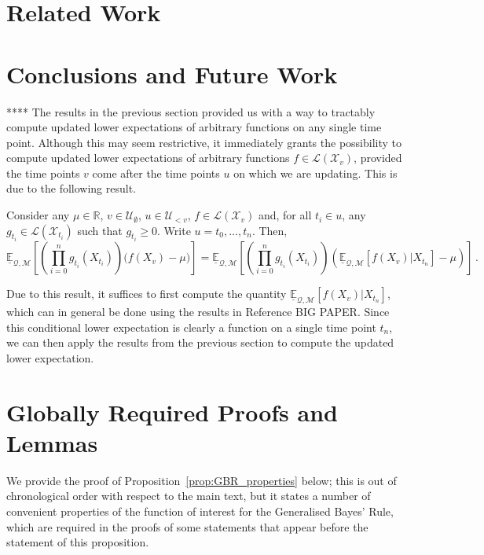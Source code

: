 \documentclass[twoside,11pt]{article}
\newcommand{\reals}{\mathbb{R}}
\newcommand{\states}{\mathcal{X}}
\newcommand{\lexp}{\underline{\mathbb{E}}_{\rateset,\mathcal{M}}}
\newcommand{\gambles}{\mathcal{L}}
\newcommand{\rateset}{\mathcal{Q}}
\begin{document}
\section{Related Work}\label{sec:related}

\section{Conclusions and Future Work}\label{sec:conclusions}

**** The results in the previous section provided us with a way to tractably compute updated lower expectations of arbitrary functions on any single time point. Although this may seem restrictive, it immediately grants the possibility to compute updated lower expectations of arbitrary functions $f\in\gambles(\states_v)$, provided the time points $v$ come after the time points $u$ on which we are updating. This is due to the following result.

\begin{proposition}\label{prop:arbitrary_future_functions}
Consider any $\mu\in\reals$, $v\in\mathcal{U}_\emptyset$, $u\in\mathcal{U}_{<v}$, $f\in\gambles(\states_v)$ and, for all $t_i\in u$, any $g_{t_i}\in\gambles(\states_{t_i})$ such that $g_{t_i}\geq 0$. Write $u=t_0,\ldots,t_n$. Then,
\begin{equation*}
\lexp\left[\left(\prod_{i=0}^n g_{t_i}(X_{t_i})\right)\bigl(f(X_v) - \mu\bigr)\right] = \lexp\left[\left(\prod_{i=0}^n g_{t_i}(X_{t_i})\right)\left(\lexp[f(X_v)\vert X_{t_n}] - \mu\right)\right]\,.
\end{equation*}
\end{proposition}
Due to this result, it suffices to first compute the quantity $\lexp[f(X_v)\vert X_{t_n}]$, which can in general be done using the results in Reference BIG PAPER. Since this conditional lower expectation is clearly a function on a single time point $t_n$, we can then apply the results from the previous section to compute the updated lower expectation.




\newpage

\appendix

\section{Globally Required Proofs and Lemmas}

We provide the proof of Proposition~\ref{prop:GBR_properties} below; this is out of chronological order with respect to the main text, but it states a number of convenient properties of the function of interest for the Generalised Bayes' Rule, which are required in the proofs of some statements that appear before the statement of this proposition.
\end{document}
